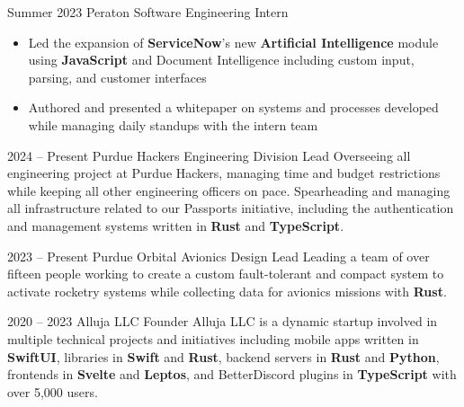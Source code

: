 \documentclass[
	10pt, %
]{FreemanCV}
\begin{document}
\begin{paracol}{2}
	\jobentry
	{Summer 2023} %
	{} %
	{Peraton} %
	{Software Engineering Intern} %
	{\vspace{-7mm}\begin{itemize}
			\item Led the expansion of \textbf{ServiceNow}'s new \textbf{Artificial Intelligence} module using \textbf{JavaScript} and Document Intelligence including custom input,\\ parsing, and customer interfaces
			\item Authored and presented a whitepaper on systems and processes developed while managing daily standups with the intern team %
		\end{itemize}} %


	\jobentry
	{2024 -- Present}
	{}
	{Purdue Hackers}
	{Engineering Division Lead}
	{Overseeing all engineering project at Purdue Hackers, managing time and budget restrictions while keeping all other engineering officers on pace. Spearheading and managing all infrastructure related to our Passports initiative, including the authentication and management systems written in \textbf{Rust} and \textbf{TypeScript}.}

	\jobentry
	{2023 -- Present} %
	{} %
	{Purdue Orbital} %
	{Avionics Design Lead} %
	{Leading a team of over fifteen people working to create a custom fault-tolerant and compact system to activate rocketry systems while collecting data for avionics missions with \textbf{Rust}.} %


	\jobentry
	{2020 -- 2023} %
	{} %
	{Alluja LLC} %
	{Founder} %
	{Alluja LLC is a dynamic startup involved in multiple technical projects and initiatives including mobile apps written in \textbf{SwiftUI}, libraries in \textbf{Swift} and \textbf{Rust}, backend servers in \textbf{Rust} and \textbf{Python}, frontends in \textbf{Svelte} and \textbf{Leptos}, and BetterDiscord plugins in \textbf{TypeScript} with over 5,000 users.} %


\end{paracol}
\end{document}
